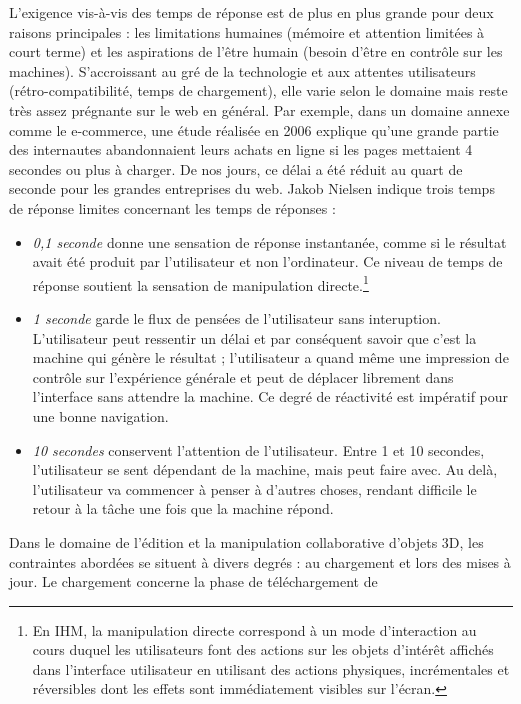 L'exigence vis-à-vis des temps de réponse est de plus en plus 
grande pour deux raisons principales : les limitations humaines (mémoire et 
attention limitées 
à court terme) et les aspirations de l'être humain (besoin d'être en contrôle sur les 
machines). S'accroissant au gré de la technologie et aux attentes 
utilisateurs (rétro-compatibilité, temps de 
chargement), elle varie selon le domaine mais reste très assez prégnante sur le 
web en général. 
Par exemple, dans un domaine annexe comme le e-commerce, une étude réalisée 
en 2006 explique qu’une grande partie des internautes abandonnaient leurs achats 
en ligne si les pages mettaient 4 secondes ou plus à charger. De nos jours, ce 
délai a été réduit au quart de seconde pour les grandes entreprises du web. Jakob 
Nielsen \cite{Nielsen1993} indique trois temps de réponse limites concernant les 
temps de réponses :
\begin{itemize}
	\item \textit{0,1 seconde} donne une sensation de réponse instantanée, comme 
	si le 
	résultat avait été produit par l'utilisateur et non l'ordinateur. Ce niveau de temps 
	de réponse soutient la sensation de manipulation directe.\footnote{En IHM, la 
		manipulation directe correspond à un mode d'interaction au cours duquel les 
		utilisateurs font des actions sur les objets d'intérêt affichés dans l'interface 
		utilisateur en utilisant des actions physiques, incrémentales et réversibles 
		dont 
		les effets sont immédiatement visibles sur l'écran.} 
	\item \textit{1 seconde} garde le flux de pensées de l'utilisateur sans 
	interuption. 
	L'utilisateur peut ressentir un délai et par conséquent savoir que c'est la 
	machine qui génère le résultat ; l'utilisateur a quand même une impression de 
	contrôle sur l'expérience générale et peut de déplacer librement dans l'interface 
	sans attendre la machine. Ce degré de réactivité est impératif pour une bonne 
	navigation.
	\item \textit{10 secondes} conservent l'attention de l'utilisateur. Entre 1 et 10 
	secondes, l'utilisateur se sent dépendant de la machine, mais peut faire avec. 
	Au delà, l'utilisateur va commencer à penser à d'autres choses, rendant difficile 
	le retour à la tâche une fois que la machine répond.
\end{itemize} 
Dans le domaine de l'édition et la manipulation collaborative 
d'objets 3D, les contraintes abordées se situent à divers degrés : au chargement 
et lors des mises à jour. Le chargement concerne la phase de téléchargement de 
